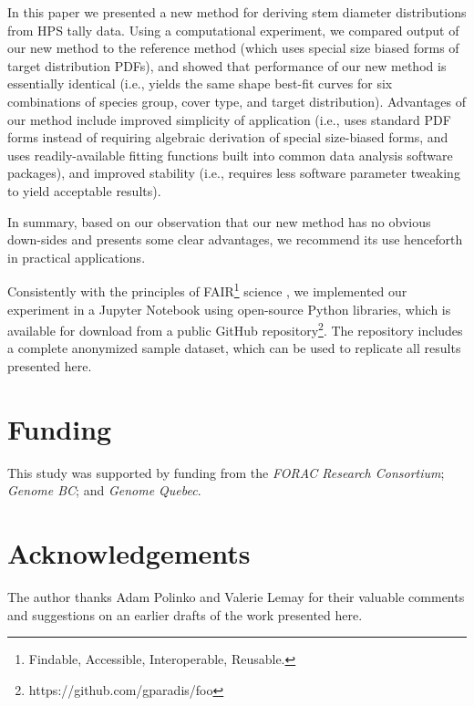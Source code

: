 \message{ !name(hpsdistfit_article.tex)}\documentclass{article}
\begin{document}
  In this paper we presented a new method for deriving stem diameter
  distributions from HPS tally data.
  Using a computational experiment, we compared output of our new
  method to the reference method (which uses special size biased forms
  of target distribution PDFs), and showed that performance of our new
  method is essentially identical (i.e., yields the same shape
  best-fit curves for six combinations of species group, cover
  type, and target distribution).
  Advantages of our method include improved simplicity of application (i.e.,
  uses standard PDF forms instead of requiring algebraic derivation of
  special size-biased forms, and uses readily-available fitting
  functions built into common data analysis software packages), and improved stability
  (i.e., requires less software parameter tweaking to yield acceptable
  results).

  In summary, based on our observation that our new method has no obvious down-sides and presents some
  clear advantages, we recommend its use henceforth in practical applications.

  Consistently with the principles of FAIR\footnote{Findable, Accessible, Interoperable, Reusable.} science \citep{stall2019make, wilkinson2016fair}, we implemented our experiment in a Jupyter Notebook using open-source Python libraries, which is available for download from a public GitHub repository\footnote{https://github.com/gparadis/foo}.  The repository includes a complete anonymized sample dataset, which can be used to replicate all results presented here.

  \section{Funding}

This study was supported by funding from the \emph{FORAC Research
  Consortium}; \emph{Genome BC}; and \emph{Genome Quebec}.

\section{Acknowledgements}

The author thanks Adam Polinko and Valerie Lemay for their valuable comments and
suggestions on an earlier drafts of the work presented here.


\begin{nolinenumbers}


\end{nolinenumbers}
\end{document}

